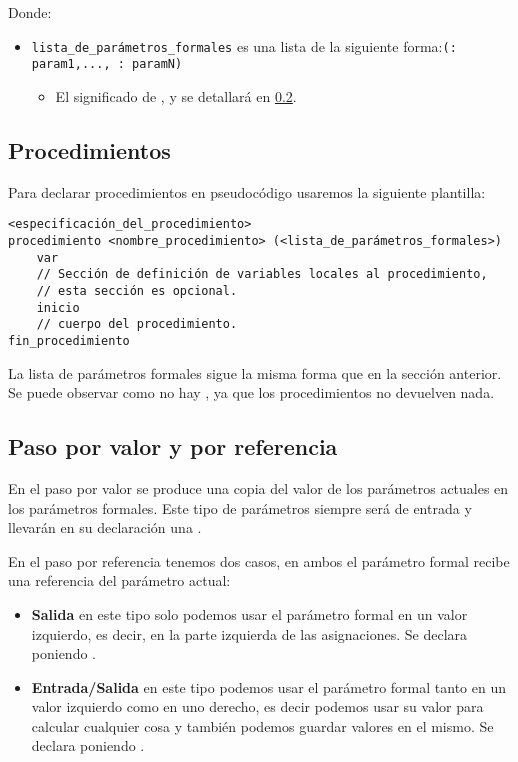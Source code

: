 \documentclass{article}
\begin{document}
Donde:

\begin{itemize}
\item \texttt{lista\_de\_parámetros\_formales} es una lista de la siguiente forma:\linebreak\newline\texttt{(: param1,{\color{red}...}, : paramN)}
  \begin{itemize} 
    \item El significado de ,  y  se detallará en \ref{subsec:pvr}.
    \end{itemize}
\end{itemize}

\pagebreak

\subsection{Procedimientos}

Para declarar procedimientos en pseudocódigo usaremos la siguiente plantilla:
\begin{lstlisting}[language = pseudocodigoesp]
<especificación_del_procedimiento>
procedimiento <nombre_procedimiento> (<lista_de_parámetros_formales>) 
    var
    // Sección de definición de variables locales al procedimiento,
    // esta sección es opcional.
    inicio
    // cuerpo del procedimiento.
fin_procedimiento
\end{lstlisting}

La lista de parámetros formales sigue la misma forma que en la sección anterior. Se puede observar como no hay , ya que los procedimientos no devuelven nada.

\subsection{Paso por valor y por referencia}
\label{subsec:pvr}

En el paso por valor se produce una copia del valor de los parámetros actuales en los parámetros formales. Este tipo de parámetros siempre será de entrada y llevarán en su declaración una .

En el paso por referencia tenemos dos casos, en ambos el parámetro formal recibe una referencia del parámetro actual:

\begin{itemize}
\item \textbf{Salida} en este tipo solo podemos usar el parámetro formal en un valor izquierdo, es decir, en la parte izquierda de las asignaciones. Se declara poniendo .
\item \textbf{Entrada/Salida} en este tipo podemos usar el parámetro formal tanto en un valor izquierdo como en uno derecho, es decir podemos usar su valor para calcular cualquier cosa y también podemos guardar valores en el mismo. Se declara poniendo .
\end{itemize}
\end{document}
